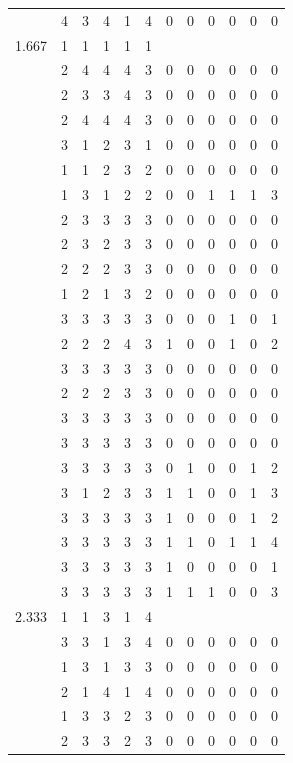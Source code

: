 \documentclass[]{msu-thesis}
\theoremstyle{definition}
\theoremstyle{definition}
\theoremstyle{definition}
\theoremstyle{remark}
\begin{document}
\begin{table}
{\begin{tabular}[t]{rrrrrrrrrrrr}
 & 4 & 3 & 4 & 1 & 4 & 0 & 0 & 0 & 0 & 0 & 0\\
1.667 & 1 & 1 & 1 & 1 & 1 &  &  &  &  &  & \\
 & 2 & 4 & 4 & 4 & 3 & 0 & 0 & 0 & 0 & 0 & 0\\
 & 2 & 3 & 3 & 4 & 3 & 0 & 0 & 0 & 0 & 0 & 0\\
 & 2 & 4 & 4 & 4 & 3 & 0 & 0 & 0 & 0 & 0 & 0\\
 & 3 & 1 & 2 & 3 & 1 & 0 & 0 & 0 & 0 & 0 & 0\\
 & 1 & 1 & 2 & 3 & 2 & 0 & 0 & 0 & 0 & 0 & 0\\
 & 1 & 3 & 1 & 2 & 2 & 0 & 0 & 1 & 1 & 1 & 3\\
 & 2 & 3 & 3 & 3 & 3 & 0 & 0 & 0 & 0 & 0 & 0\\
 & 2 & 3 & 2 & 3 & 3 & 0 & 0 & 0 & 0 & 0 & 0\\
 & 2 & 2 & 2 & 3 & 3 & 0 & 0 & 0 & 0 & 0 & 0\\
 & 1 & 2 & 1 & 3 & 2 & 0 & 0 & 0 & 0 & 0 & 0\\
 & 3 & 3 & 3 & 3 & 3 & 0 & 0 & 0 & 1 & 0 & 1\\
 & 2 & 2 & 2 & 4 & 3 & 1 & 0 & 0 & 1 & 0 & 2\\
 & 3 & 3 & 3 & 3 & 3 & 0 & 0 & 0 & 0 & 0 & 0\\
 & 2 & 2 & 2 & 3 & 3 & 0 & 0 & 0 & 0 & 0 & 0\\
 & 3 & 3 & 3 & 3 & 3 & 0 & 0 & 0 & 0 & 0 & 0\\
 & 3 & 3 & 3 & 3 & 3 & 0 & 0 & 0 & 0 & 0 & 0\\
 & 3 & 3 & 3 & 3 & 3 & 0 & 1 & 0 & 0 & 1 & 2\\
 & 3 & 1 & 2 & 3 & 3 & 1 & 1 & 0 & 0 & 1 & 3\\
 & 3 & 3 & 3 & 3 & 3 & 1 & 0 & 0 & 0 & 1 & 2\\
 & 3 & 3 & 3 & 3 & 3 & 1 & 1 & 0 & 1 & 1 & 4\\
 & 3 & 3 & 3 & 3 & 3 & 1 & 0 & 0 & 0 & 0 & 1\\
 & 3 & 3 & 3 & 3 & 3 & 1 & 1 & 1 & 0 & 0 & 3\\
2.333 & 1 & 1 & 3 & 1 & 4 &  &  &  &  &  & \\
 & 3 & 3 & 1 & 3 & 4 & 0 & 0 & 0 & 0 & 0 & 0\\
 & 1 & 3 & 1 & 3 & 3 & 0 & 0 & 0 & 0 & 0 & 0\\
 & 2 & 1 & 4 & 1 & 4 & 0 & 0 & 0 & 0 & 0 & 0\\
 & 1 & 3 & 3 & 2 & 3 & 0 & 0 & 0 & 0 & 0 & 0\\
 & 2 & 3 & 3 & 2 & 3 & 0 & 0 & 0 & 0 & 0 & 0\\

\end{tabular}}
\end{table}
\end{document}
